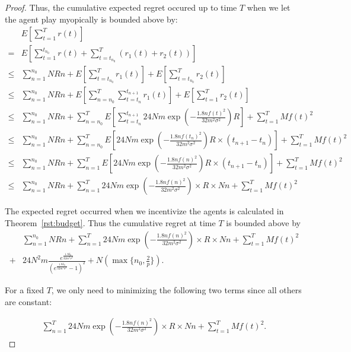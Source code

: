 \documentclass{article}
\begin{document}
\begin{proof}
Thus, the cumulative expected regret occured up to time $T$ when we let the agent play myopically is bounded above by:
\begin{align}
&E\left[\sum_{t=1}^{T}r(t)\right] \nonumber \\
=&E\left[\sum_{t=1}^{t_{n_{0}}} r(t) + \sum_{t=t_{n_{0}}}^{T}(r_1(t)+r_2(t))\right]  \nonumber \\
\leq & \sum_{n=1}^{n_{0}}NRn + E\left[\sum_{t=t_{n_{0}}}^{T}r_1(t)\right]+ E\left[\sum_{t=t_{n_{0}}}^{T}r_2(t)\right] \nonumber \\
\leq & \sum_{n=1}^{n_{0}}NRn + E\left[\sum_{n=n_{0}}^{T}\sum_{t=t_{n}}^{t_{n+1}}r_1(t)\right]+ E\left[\sum_{t=1}^{T}r_2(t)\right] \nonumber \\
\leq & \sum_{n=1}^{n_{0}}NRn + \sum_{n=n_{0}}^{T}E\left[\sum_{t=t_{n}}^{t_{n+1}}24Nm\exp\left(-\frac{1.8n f(t)^2}{32 m^2\sigma^2}\right) R\right]+ \sum_{t=1}^{T}Mf(t)^2 \nonumber \\
\leq & \sum_{n=1}^{n_{0}}NRn + \sum_{n=n_{0}}^{T}E\left[24Nm\exp\left(-\frac{1.8n f(t_n)^2}{32 m^2\sigma^2}\right)R \times (t_{n+1}-t_{n})\right]+ \sum_{t=1}^{T}Mf(t)^2 \nonumber \\
\leq & \sum_{n=1}^{n_{0}}NRn + \sum_{n=1}^{T}E\left[24Nm\exp\left(-\frac{1.8n f(n)^2}{32 m^2\sigma^2}\right)R\times (t_{n+1}-t_{n})\right]+ \sum_{t=1}^{T}Mf(t)^2 \nonumber \\
\leq & \sum_{n=1}^{n_{0}}NRn + \sum_{n=1}^{T} 24Nm\exp\left(-\frac{1.8n f(n)^2}{32 m^2\sigma^2}\right)\times R \times Nn+ \sum_{t=1}^{T}Mf(t)^2 \nonumber
\end{align}

The expected regret occurred when we incentivize the agents is calculated in Theorem~\ref{rst:budget}. Thus the cumulative regret at time $T$ is bounded above by
\begin{align}
&\sum_{n=1}^{n_{0}}NRn + \sum_{n=1}^{T} 24Nm\exp\left(-\frac{1.8n f(n)^2}{32 m^2\sigma^2}\right)\times R \times Nn+ \sum_{t=1}^{T}Mf(t)^2 \nonumber \\
+ & 24N^2 m \frac{e^{\frac{1.8\delta_{0}}{32m^2\sigma^2}}}{(e^{\frac{1.8\delta_{0}}{32m^2\sigma^2}}-1)^2}+N(\max\{n_{0},\frac{2}{p}\}). \nonumber
\end{align}

For a fixed $T$, we only need to minimizing the following two terms since all others are constant:

\begin{align}
\sum_{n=1}^{T} 24Nm\exp\left(-\frac{1.8n f(n)^2}{32 m^2\sigma^2}\right)\times R \times Nn+ \sum_{t=1}^{T}Mf(t)^2.
\end{align}



\end{proof}
\end{document}

